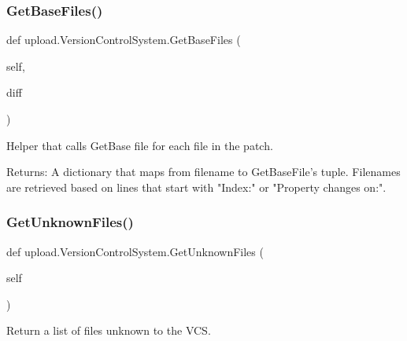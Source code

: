 \subsubsection{\texorpdfstring{Get\+Base\+Files()}{GetBaseFiles()}\hspace{0.1cm}{\footnotesize\ttfamily [2/2]}}
{\footnotesize\ttfamily def upload.\+Version\+Control\+System.\+Get\+Base\+Files (\begin{DoxyParamCaption}\item[{}]{self,  }\item[{}]{diff }\end{DoxyParamCaption})}

\begin{DoxyVerb}Helper that calls GetBase file for each file in the patch.

Returns:
  A dictionary that maps from filename to GetBaseFile's tuple.  Filenames
  are retrieved based on lines that start with "Index:" or
  "Property changes on:".
\end{DoxyVerb}
 \mbox{\label{classupload_1_1_version_control_system_a56a60e56aa9aff3df4001d2f84cab884}} 
\subsubsection{\texorpdfstring{Get\+Unknown\+Files()}{GetUnknownFiles()}\hspace{0.1cm}{\footnotesize\ttfamily [1/2]}}
{\footnotesize\ttfamily def upload.\+Version\+Control\+System.\+Get\+Unknown\+Files (\begin{DoxyParamCaption}\item[{}]{self }\end{DoxyParamCaption})}

\begin{DoxyVerb}Return a list of files unknown to the VCS.\end{DoxyVerb}
 \mbox{\label{classupload_1_1_version_control_system_a56a60e56aa9aff3df4001d2f84cab884}} 
